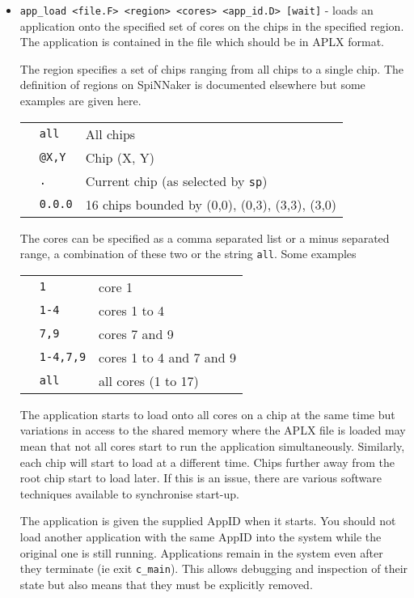 \begin{itemize}

\item
\texttt{app\_load <file.F> <region> <cores> <app\_id.D> [wait]} - 
loads an application onto the specified set of cores on the chips in
the specified region. The application is contained in the file which
should be in APLX format.

The region specifies a set of chips ranging from all chips to a single
chip. The definition of regions on SpiNNaker is documented elsewhere
but some examples are given here.

\begin{tabular}{p{0.5cm} p{2cm} p{12cm}}
& \texttt{all} & All chips \\
& \texttt{@X,Y} & Chip (X, Y) \\
& \texttt{.} & Current chip (as selected by \texttt{sp}) \\
& \texttt{0.0.0} & 16 chips bounded by (0,0), (0,3), (3,3), (3,0) \\
\end{tabular}

The cores can be specified as a comma separated list or a minus
separated range, a combination of these two or the
string \texttt{all}. Some examples

\begin{tabular}{p{0.5cm} p{2cm} p{12cm}}
& \texttt{1} & core 1 \\
& \texttt{1-4} & cores 1 to 4 \\
& \texttt{7,9} & cores 7 and 9 \\
& \texttt{1-4,7,9} & cores 1 to 4 and 7 and 9 \\
& \texttt{all} & all cores (1 to 17)\\
\end{tabular}

The application starts to load onto all cores on a chip at the same
time but variations in access to the shared memory where the APLX file
is loaded may mean that not all cores start to run the application
simultaneously. Similarly, each chip will start to load at a different
time. Chips further away from the root chip start to load later. If
this is an issue, there are various software techniques available to
synchronise start-up.

The application is given the supplied AppID when it starts. You should
not load another application with the same AppID into the system while
the original one is still running. Applications remain in the system
even after they terminate (ie exit \texttt{c\_main}). This allows
debugging and inspection of their state but also means that they must
be explicitly removed.


\end{itemize}
